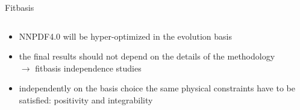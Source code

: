 \begin{frame}{Fitbasis}
\begin{columns}
\begin{column}{0.45\textwidth}
	\end{column}
\end{columns}
\begin{itemize}
	\item NNPDF4.0 will be hyper-optimized in the evolution basis \newline
	\item the final results should not depend on the details of the methodology \\
	$\rightarrow$ fitbasis independence studies \newline
	\item independently on the basis choice the same physical constraints have to be satisfied: positivity and integrability
\end{itemize}
\end{frame}



